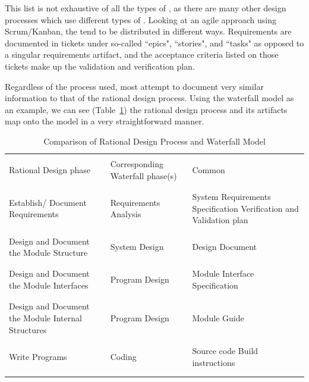 This list is not exhaustive of all the types of \sfs{}, as there are many other
design processes which use different types of \sfs{}. Looking at an agile 
approach using Scrum/Kanban, the \sfs{} tend to be distributed in different 
ways. Requirements are documented in tickets under so-called ``epics", 
``stories", and ``tasks" as opposed to a singular requirements artifact, and 
the acceptance criteria listed on those tickets make up the validation and 
verification plan. 

Regardless of the process used, most attempt to document very similar 
information to that of the rational design process. Using the waterfall model 
as an example, we can see (Table~\ref{tab:RatWatComp}) the rational design 
process and its artifacts map onto the model in a very straightforward manner.

\begin{table}[htbp]
\caption{Comparison of Rational Design Process and Waterfall Model}
\label{tab:RatWatComp}
\begin{tabular}{|p{.25\linewidth}|p{.35\linewidth}|p{.4\linewidth}|}
\hline &&\\
Rational Design phase & Corresponding Waterfall phase(s) & Common \SFS{}
\\&&\\ \hline &&\\
	Establish/ Document Requirements & Requirements Analysis & System 
	Requirements Specification \newline \newline
	Verification and Validation plan
\\&&\\ \hline &&\\
	Design and Document the Module Structure & 
	System Design  & 
	Design Document
\\&&\\ \hline &&\\
	Design and Document the Module Interfaces & 
	Program Design & 
	Module Interface Specification
\\&&\\ \hline &&\\
	Design and Document the Module Internal Structures &
	Program Design &
	Module Guide
\\&&\\ \hline &&\\
	Write Programs & 
	Coding &
	Source code  \newline \newline
	Build instructions
\\&&\\ \hline &&\\

\end{tabular}
\end{table}
